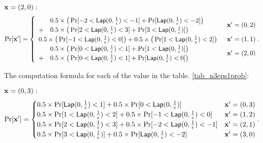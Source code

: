 \documentclass{article}
\begin{document}
{{\noindent $\textbf{x} = (2,0):$
\[
\Pr[\textbf{x}']
= \begin{cases}
\begin{array}{ll}
 	& 0.5 \times 
 	\big(
 	\Pr[	-2	< \mathsf{Lap}(0, \frac{1}{\epsilon})	<	-1] 
 	+ 
 	\Pr[	\mathsf{Lap}(0, \frac{1}{\epsilon})			< 	-2] 
 	\big) \\
 	+ 	
 	& 0.5 \times 
 	\big(
 	\Pr[	2	< \mathsf{Lap}(0, \frac{1}{\epsilon})	<	3] 
 	+ 
 	\Pr[	3	< \mathsf{Lap}(0, \frac{1}{\epsilon})] 
 	\big) 
\end{array} 
	& \textbf{x}' = (0, 2)\\
\begin{array}{ll}
 	0.5 \times 
 	\big(
 	\Pr[	-1	< \mathsf{Lap}(0, \frac{1}{\epsilon})	<	0] 
 	\big)
 	+ 	
 	0.5 \times 
 	\big(
 	\Pr[	1	< \mathsf{Lap}(0, \frac{1}{\epsilon})	<	2] 
 	\big) 
\end{array}  
	& \textbf{x}' = (1, 1)\\
\begin{array}{ll}
 	& 0.5 \times 
 	\big(
 	\Pr[	0	<	\mathsf{Lap}(0, \frac{1}{\epsilon})	<	1] 
 	+ 
 	\Pr[	1	<	\mathsf{Lap}(0, \frac{1}{\epsilon})]
 	\big) \\
 	+ 	
 	& 0.5 \times 
 	\big(
 	\Pr[	0	< \mathsf{Lap}(0, \frac{1}{\epsilon})	<	1] 
 	+ 
 	\Pr[	\mathsf{Lap}(0, \frac{1}{\epsilon})			<	0] 
 	\big) 
\end{array}  
& \textbf{x}' = (2, 0)
\end{cases}.
\]
}

The computation formula for each of the value in the table. \ref{tab_n3eps1prob}:

{\small

\noindent $\textbf{x} = (0,3):$
\[
\Pr[\dataobs']
= \begin{cases}
	0.5 \times 
 	\Pr[	\lap{0}{\frac{1}{\epsilon}}	<	1] 
 	+ 	
 	0.5 \times 
 	\Pr[	0	< \lap{0}{\frac{1}{\epsilon}}] 
%
	& \dataobs' = (0, 3)\\
%
 	0.5 \times 
 	\Pr[	1	< \lap{0}{\frac{1}{\epsilon}}	<	2] 
 	+ 	
 	0.5 \times 
 	\Pr[	-1	< \lap{0}{\frac{1}{\epsilon}}	<	0] 
%
	& \dataobs' = (1, 2)\\
%
 	0.5 \times 
 	\Pr[	2	<	\lap{0}{\frac{1}{\epsilon}}	<	3] 
 	+ 	
 	0.5 \times 
 	\Pr[	-2	< \lap{0}{\frac{1}{\epsilon}}	<	-1] 
%
	& \dataobs' = (2, 1)\\
%
 	0.5 \times 
 	\Pr[	3	<	\lap{0}{\frac{1}{\epsilon}}]
 	+ 	
 	0.5 \times 
 	\Pr[	\lap{0}{\frac{1}{\epsilon}}	<	-2] 
%
& \dataobs' = (3, 0)
\end{cases}.
\]


}}
\end{document}
